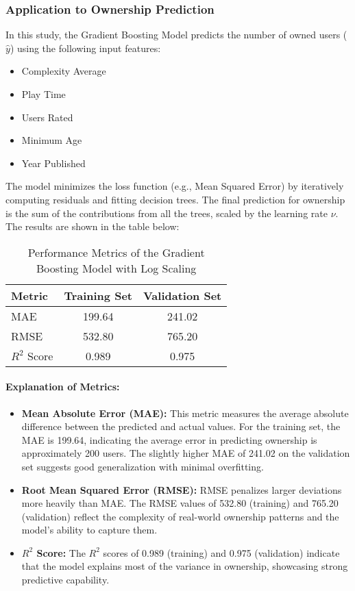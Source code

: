 \documentclass{article}
\begin{document}
\subsubsection{Application to Ownership Prediction}
In this study, the Gradient Boosting Model predicts the number of owned users (\( \hat{y} \)) using the following input features:
\begin{itemize}
    \item Complexity Average
    \item Play Time
    \item Users Rated
    \item Minimum Age
    \item Year Published
\end{itemize}

The model minimizes the loss function (e.g., Mean Squared Error) by iteratively computing residuals and fitting decision trees. The final prediction for ownership is the sum of the contributions from all the trees, scaled by the learning rate \( \nu \). The results are shown in the table below:

\begin{table}[H]
\centering
\begin{tabular}{|l|c|c|}
\hline
\textbf{Metric} & \textbf{Training Set} & \textbf{Validation Set} \\
\hline
MAE & 199.64 & 241.02 \\
RMSE & 532.80 & 765.20 \\
\( R^2 \) Score & 0.989 & 0.975 \\
\hline
\end{tabular}
\caption{Performance Metrics of the Gradient Boosting Model with Log Scaling}
\label{table:model_metrics}
\end{table}

\paragraph{Explanation of Metrics:}
\begin{itemize}
    \item \textbf{Mean Absolute Error (MAE):} This metric measures the average absolute difference between the predicted and actual values. For the training set, the MAE is 199.64, indicating the average error in predicting ownership is approximately 200 users. The slightly higher MAE of 241.02 on the validation set suggests good generalization with minimal overfitting.
    \item \textbf{Root Mean Squared Error (RMSE):} RMSE penalizes larger deviations more heavily than MAE. The RMSE values of 532.80 (training) and 765.20 (validation) reflect the complexity of real-world ownership patterns and the model's ability to capture them.
    \item \textbf{\( R^2 \) Score:} The \( R^2 \) scores of 0.989 (training) and 0.975 (validation) indicate that the model explains most of the variance in ownership, showcasing strong predictive capability.
\end{itemize}
\end{document}
